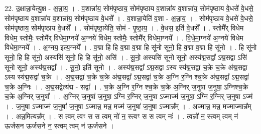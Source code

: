 \documentclass[17pt]{extarticle}
\begin{document}
22. उ॒क्षान्ना॒येत्यु॒क्ष - अ॒न्ना॒य॒ । . व॒शान्ना॑य॒ सोम॑पृष्ठाय॒ सोम॑पृष्ठाय व॒शान्ना॑य व॒शान्ना॑य॒ सोम॑पृष्ठाय वे॒धसे॑ वे॒धसे॒ सोम॑पृष्ठाय व॒शान्ना॑य व॒शान्ना॑य॒ सोम॑पृष्ठाय वे॒धसे᳚ । . व॒शान्ना॒येति॑ व॒शा - अ॒न्ना॒य॒ । . सोम॑पृष्ठाय वे॒धसे॑ वे॒धसे॒ सोम॑पृष्ठाय॒ सोम॑पृष्ठाय वे॒धसे᳚ । . सोम॑पृष्ठा॒येति॒ सोम॑ - पृ॒ष्ठा॒य॒ । . वे॒धस॒ इति॑ वे॒धसे᳚ । . स्तोमै᳚र् विधेम विधेम॒ स्तोमैः॒ स्तोमै᳚र् विधेमा॒ग्नये॑ अ॒ग्नये॑ विधेम॒ स्तोमैः॒ स्तोमै᳚र् विधेमा॒ग्नये᳚ । . वि॒धे॒मा॒ग्नये॑ अ॒ग्नये॑ विधेम विधेमा॒ग्नये᳚ । . अ॒ग्नय॒ इत्य॒ग्नये᳚ । . व॒द्मा हि हि व॒द्मा व॒द्मा हि सू॑नो सूनो॒ हि व॒द्मा व॒द्मा हि सू॑नो । . हि सू॑नो सूनो॒ हि हि सू॑नो॒ अस्यसि॑ सूनो॒ हि हि सू॑नो॒ असि॑ । . सू॒नो॒ अस्यसि॑ सूनो सूनो॒ अस्य॑द्म॒सद्वा᳚ ऽद्म॒सद्वा ऽसि॑ सूनो सूनो॒ अस्य॑द्म॒सद्वा᳚ । . सू॒नो॒ इति॑ सूनो । . अस्य॑द्म॒सद्वा᳚ ऽद्म॒सद्वा ऽस्य स्य॑द्म॒सद्वा॑ च॒क्रे च॒क्रे अ॑द्म॒सद्वा ऽस्य स्य॑द्म॒सद्वा॑ च॒क्रे । . अ॒द्म॒सद्वा॑ च॒क्रे च॒क्रे अ॑द्म॒सद्वा᳚ ऽद्म॒सद्वा॑ च॒क्रे अ॒ग्नि र॒ग्नि श्च॒क्रे अ॑द्म॒सद्वा᳚ ऽद्म॒सद्वा॑ च॒क्रे अ॒ग्निः । . अ॒द्म॒सद्वेत्य॑द्म - सद्वा᳚ । . च॒क्रे अ॒ग्नि र॒ग्नि श्च॒क्रे च॒क्रे अ॒ग्निर् ज॒नुषा॑ ज॒नुषा॒ ऽग्निश्च॒क्रे च॒क्रे अ॒ग्निर् ज॒नुषा᳚ । . अ॒ग्निर् ज॒नुषा॑ ज॒नुषा॒ ऽग्नि र॒ग्निर् ज॒नुषा ऽज्माज्म॑ ज॒नुषा॒ ऽग्नि र॒ग्निर् ज॒नुषा ऽज्म॑ । . ज॒नुषा ऽज्माज्म॑ ज॒नुषा॑ ज॒नुषा ऽज्मान्न॒ मन्न॒ मज्म॑ ज॒नुषा॑ ज॒नुषा ऽज्मान्न᳚म् । . अज्मान्न॒ मन्न॒ मज्माज्मान्न᳚म् । . अन्न॒मित्यन्न᳚म् । . स त्वम् त्वꣳ स स त्वम् नो॑ न॒ स्त्वꣳ स स त्वम् नः॑ । . त्वन्नो॑ न॒ स्त्वम् त्वम् न॑ ऊर्जसन ऊर्जसने न॒ स्त्वम् त्वम् न॑ ऊर्जसने । \newline
\end{document}
